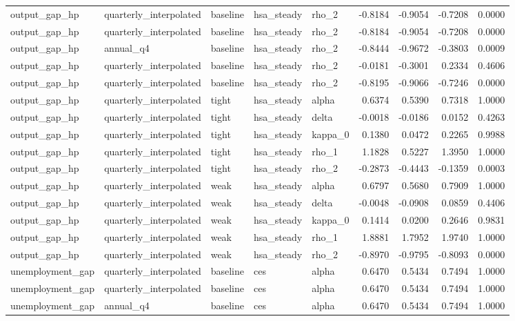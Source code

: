 \begin{tabular}{lllllrrrr}
output\_gap\_hp & quarterly\_interpolated & baseline & hsa\_steady & rho\_2 & -0.8184 & -0.9054 & -0.7208 & 0.0000 \\
output\_gap\_hp & quarterly\_interpolated & baseline & hsa\_steady & rho\_2 & -0.8184 & -0.9054 & -0.7208 & 0.0000 \\
output\_gap\_hp & annual\_q4 & baseline & hsa\_steady & rho\_2 & -0.8444 & -0.9672 & -0.3803 & 0.0009 \\
output\_gap\_hp & quarterly\_interpolated & baseline & hsa\_steady & rho\_2 & -0.0181 & -0.3001 & 0.2334 & 0.4606 \\
output\_gap\_hp & quarterly\_interpolated & baseline & hsa\_steady & rho\_2 & -0.8195 & -0.9066 & -0.7246 & 0.0000 \\
output\_gap\_hp & quarterly\_interpolated & tight & hsa\_steady & alpha & 0.6374 & 0.5390 & 0.7318 & 1.0000 \\
output\_gap\_hp & quarterly\_interpolated & tight & hsa\_steady & delta & -0.0018 & -0.0186 & 0.0152 & 0.4263 \\
output\_gap\_hp & quarterly\_interpolated & tight & hsa\_steady & kappa\_0 & 0.1380 & 0.0472 & 0.2265 & 0.9988 \\
output\_gap\_hp & quarterly\_interpolated & tight & hsa\_steady & rho\_1 & 1.1828 & 0.5227 & 1.3950 & 1.0000 \\
output\_gap\_hp & quarterly\_interpolated & tight & hsa\_steady & rho\_2 & -0.2873 & -0.4443 & -0.1359 & 0.0003 \\
output\_gap\_hp & quarterly\_interpolated & weak & hsa\_steady & alpha & 0.6797 & 0.5680 & 0.7909 & 1.0000 \\
output\_gap\_hp & quarterly\_interpolated & weak & hsa\_steady & delta & -0.0048 & -0.0908 & 0.0859 & 0.4406 \\
output\_gap\_hp & quarterly\_interpolated & weak & hsa\_steady & kappa\_0 & 0.1414 & 0.0200 & 0.2646 & 0.9831 \\
output\_gap\_hp & quarterly\_interpolated & weak & hsa\_steady & rho\_1 & 1.8881 & 1.7952 & 1.9740 & 1.0000 \\
output\_gap\_hp & quarterly\_interpolated & weak & hsa\_steady & rho\_2 & -0.8970 & -0.9795 & -0.8093 & 0.0000 \\
unemployment\_gap & quarterly\_interpolated & baseline & ces & alpha & 0.6470 & 0.5434 & 0.7494 & 1.0000 \\
unemployment\_gap & quarterly\_interpolated & baseline & ces & alpha & 0.6470 & 0.5434 & 0.7494 & 1.0000 \\
unemployment\_gap & annual\_q4 & baseline & ces & alpha & 0.6470 & 0.5434 & 0.7494 & 1.0000 \\

\end{tabular}
